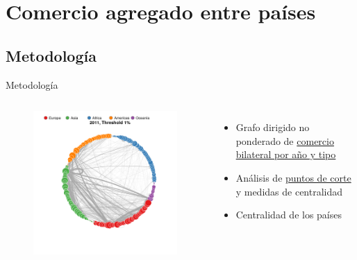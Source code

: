 \documentclass[compress]{beamer}
\begin{document}
\section{Comercio agregado entre países}

\subsection{Metodología}


\begin{frame}
\centering
\Large Metodología
\end{frame}



\begin{frame}
\begin{columns}[c] 

\begin{figure}
\includegraphics[width=1.4\linewidth]{grafo_Circ_2011_1_pcnt}
\end{figure}

\small

\begin{itemize}

\item[\faRebel] Grafo dirigido no ponderado de \underline{comercio bilateral por año y tipo} 
\item[\faRebel] Análisis de \underline{puntos de corte} y medidas de centralidad
\item[\faRebel] Centralidad de los países
\end{itemize}


\end{columns}
\end{frame}
\end{document}
